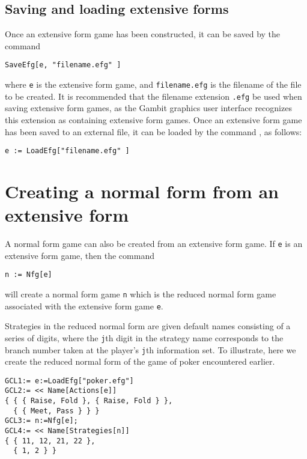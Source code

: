 \subsection{Saving and loading extensive forms}

Once an extensive form game has been constructed, it can be saved by
the command 

\begin{verbatim}
SaveEfg[e, "filename.efg" ]
\end{verbatim}

\noindent where \verb+e+ is the extensive form game, and
\verb+filename.efg+ is the filename of the file to be created.  It is
recommended that the filename extension \verb+.efg+ be used when
saving extensive form games, as the Gambit graphics user interface
recognizes this extension as containing extensive form games.  Once an
extensive form game has been saved to an external file, it can be
loaded by the command , as follows:

\begin{verbatim}
e := LoadEfg["filename.efg" ]
\end{verbatim}

\section{Creating a normal form from an extensive form}

A normal form game can also be created from an extensive form game.
If \verb+e+ is an extensive form game, then the command 

\begin{verbatim}
n := Nfg[e]
\end{verbatim}

\noindent
will create a normal form game \verb+n+ which is the reduced normal
form game associated with the extensive form game \verb+e+.  

Strategies in the reduced normal form are given default names
consisting of a series of digits, where the \verb+j+th digit in the
strategy name corresponds to the branch number taken at the player's
\verb+j+th information set.  To illustrate, here we create the reduced
normal form of the game of poker encountered earlier.  

\begin{verbatim}
GCL1:= e:=LoadEfg["poker.efg"]
GCL2:= << Name[Actions[e]]
{ { { Raise, Fold }, { Raise, Fold } },
  { { Meet, Pass } } }
GCL3:= n:=Nfg[e];
GCL4:= << Name[Strategies[n]]
{ { 11, 12, 21, 22 },
  { 1, 2 } }
\end{verbatim}

